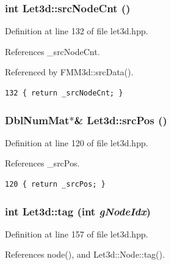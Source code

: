 \subsubsection{\setlength{\rightskip}{0pt plus 5cm}int Let3d::src\-Node\-Cnt ()\hspace{0.3cm}{\tt  [inline]}}\label{classLet3d_69b43bb5940038243065dc6bc4ad0fcb_69b43bb5940038243065dc6bc4ad0fcb}




Definition at line 132 of file let3d.hpp.

References \_\-src\-Node\-Cnt.

Referenced by FMM3d::src\-Data().

\footnotesize\begin{verbatim}132 { return _srcNodeCnt; }
\end{verbatim}\normalsize 


\subsubsection{\setlength{\rightskip}{0pt plus 5cm}Dbl\-Num\-Mat$\ast$\& Let3d::src\-Pos ()\hspace{0.3cm}{\tt  [inline]}}\label{classLet3d_caa1dae06f56964efa0f778b696dce61_caa1dae06f56964efa0f778b696dce61}




Definition at line 120 of file let3d.hpp.

References \_\-src\-Pos.

\footnotesize\begin{verbatim}120 { return _srcPos; }
\end{verbatim}\normalsize 


\subsubsection{\setlength{\rightskip}{0pt plus 5cm}int Let3d::tag (int {\em g\-Node\-Idx})\hspace{0.3cm}{\tt  [inline]}}\label{classLet3d_07c220944caf5b6aa5c5454c42d18753_07c220944caf5b6aa5c5454c42d18753}




Definition at line 157 of file let3d.hpp.

References node(), and Let3d::Node::tag().

